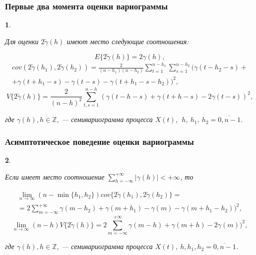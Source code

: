 \documentclass[notheorems]{beamer}
\newtheorem{theorem}{\translate{Theorem}}[section]
\newtheorem{theorem}{\translate{Theorem}}
\theoremstyle{definition}
\theoremstyle{example}
\theoremstyle{plain}
\newenvironment{Theorem}{\begin{theorem}}{\end{theorem}}
\begin{document}
\begin{frame}
  \frametitle{Первые два момента оценки вариограммы}
\begin{Theorem}
\begin{footnotesize}
  Для оценки $ 2 \tilde{\gamma}(h) $ имеют место следующие соотношения:
\end{footnotesize}
  \begin{equation*}
    E \{2 \tilde{\gamma}(h) \} = 2 \gamma(h), %
  \end{equation*}
  \begin{eqnarray*}
    cov(2 \tilde{\gamma}(h_1), 2 \tilde{\gamma}(h_2)) = \frac{2}{(n - h_1)(n - h_2)} \sum_{t = 1}^{n - h_1}\sum_{s = 1}^{n - h_2} (\gamma(t - h_2 - s) + \\
    + \gamma(t + h_1 - s) - \gamma(t - s) - \gamma(t + h_1 - s - h_2))^2,
  \end{eqnarray*}
  \begin{equation*}
    V \{ 2 \tilde{\gamma}(h) \} = \frac{2}{(n-h)^2}\sum_{t,s = 1}^{n - h} ( \gamma(t - h - s) + \gamma(t + h - s) - 2\gamma(t - s) )^2,
  \end{equation*}
\begin{footnotesize}
  где $ \gamma(h), h \in \mathbb{Z} $, --- семивариограмма процесса $ X(t) $, $ ~h,~ h_1,~ h_2 = \overline{0, n - 1} $.
\end{footnotesize}
\end{Theorem}
\end{frame}

\begin{frame}
  \frametitle{Асимптотическое поведение оценки вариограммы}
  \begin{Theorem}
  \begin{footnotesize}
  Если имеет место соотношение $ \sum_{h = -\infty}^{+\infty} \vert \gamma(h) \vert < +\infty $, то
  \end{footnotesize}
  \begin{eqnarray*}
    \lim_{n \to \infty} (n - \min\{ h_1, h_2 \}) cov\{ 2 \tilde{\gamma}(h_1), 2 \tilde{\gamma}(h_2) \} = \nonumber \\
    = 2 \sum_{m = -\infty}^{+\infty} \gamma(m - h_2) + \gamma(m + h_1) - \gamma(m) - \gamma(m + h_1 - h_2))^2,
  \end{eqnarray*}
  \begin{equation*}
    \lim_{n \to \infty} (n - h) V\{ 2 \tilde{\gamma}(h) \} = 2 \sum_{m = -\infty}^{+\infty} \gamma(m - h) + \gamma(m + h) - 2 \gamma(m))^2,
  \end{equation*}
  \begin{footnotesize}
  где $ \gamma(h), h \in \mathbb{Z} $, --- семивариограмма процесса $ X(t) $, $ h, h_1, h_2 = \overline{0, n - 1} $.
  \end{footnotesize}
\end{Theorem}
\end{frame}
\end{document}
